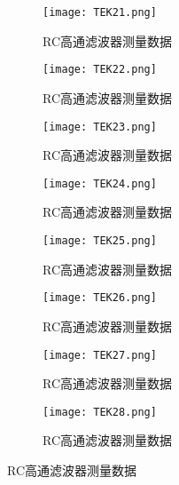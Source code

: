 \begin{figure}[htpb]
	\centering
	\begin{subfigure}[htpb]{.45\linewidth}
		\centering
		\texttt{[image: TEK21.png]}
		\caption{RC高通滤波器测量数据}
		\label{fig:RC高通滤波器测量数据\arabic{subfigure}}
	\end{subfigure}
	\quad
	\begin{subfigure}[htpb]{.45\linewidth}
		\centering
		\texttt{[image: TEK22.png]}
		\caption{RC高通滤波器测量数据}
		\label{fig:RC高通滤波器测量数据\arabic{subfigure}}
	\end{subfigure}
	\begin{subfigure}[htpb]{.45\linewidth}
		\centering
		\texttt{[image: TEK23.png]}
		\caption{RC高通滤波器测量数据}
		\label{fig:RC高通滤波器测量数据\arabic{subfigure}}
	\end{subfigure}
	\quad
	\begin{subfigure}[htpb]{.45\linewidth}
		\centering
		\texttt{[image: TEK24.png]}
		\caption{RC高通滤波器测量数据}
		\label{fig:RC高通滤波器测量数据\arabic{subfigure}}
	\end{subfigure}
	\begin{subfigure}[htpb]{.45\linewidth}
		\centering
		\texttt{[image: TEK25.png]}
		\caption{RC高通滤波器测量数据}
		\label{fig:RC高通滤波器测量数据\arabic{subfigure}}
	\end{subfigure}
	\quad
	\begin{subfigure}[htpb]{.45\linewidth}
		\centering
		\texttt{[image: TEK26.png]}
		\caption{RC高通滤波器测量数据}
		\label{fig:RC高通滤波器测量数据\arabic{subfigure}}
	\end{subfigure}
	\begin{subfigure}[htpb]{.45\linewidth}
		\centering
		\texttt{[image: TEK27.png]}
		\caption{RC高通滤波器测量数据}
		\label{fig:RC高通滤波器测量数据\arabic{subfigure}}
	\end{subfigure}
	\quad
	\begin{subfigure}[htpb]{.45\linewidth}
		\centering
		\texttt{[image: TEK28.png]}
		\caption{RC高通滤波器测量数据}
		\label{fig:RC高通滤波器测量数据\arabic{subfigure}}
	\end{subfigure}
\end{figure}
\addtocounter{figure}{-1}
